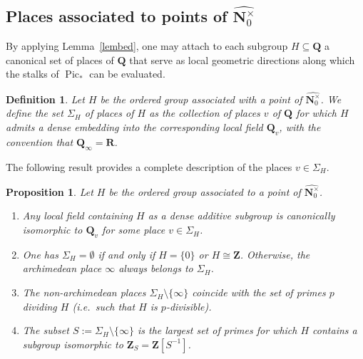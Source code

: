 \documentclass[11pt,a4paper]{article}
\newtheorem{proposition}[theorem]{Proposition}
\newtheorem{definition}[theorem]{Definition}
\newcommand{\N}{\mathbf{N}}
\newcommand{\Q}{\mathbf{Q}}
\newcommand{\R}{\mathbf{R}}
\newcommand{\Z}{\mathbf{Z}}
\newcommand{\nato}{\widehat{\N^\times_0}}
\newcommand{\Pic}{\operatorname{Pic}} \newcommand{\Jac}{\operatorname{Jac}}
\newcommand{\picone}{{\Pic}_{*}}
\def\ie{{\it i.e.\/}\ }
\begin{document}
\subsection{Places associated to points of $\nato$}

By applying Lemma~\ref{lembed}, one may attach to each subgroup $H\subseteq \Q$ a canonical set of places of $\Q$ that serve as local geometric directions along which the stalks of $\picone$ can be evaluated.

\begin{definition}\label{setplaces}
Let $H$ be the ordered group associated with a point of $\nato$. We define the set $\Sigma_H$ of \emph{places of $H$} as the collection of places $v$ of $\Q$ for which $H$ admits a dense embedding into the corresponding local field $\Q_v$, with the convention that $\Q_\infty=\R$.
\end{definition}

The following result provides a complete description 
of the places $v\in\Sigma_H$.

\begin{proposition}\label{classpla}
Let $H$ be the ordered group associated to a point of $\nato$. 
\begin{enumerate}
    \item[(i)] Any local field containing $H$ as a dense additive subgroup is canonically isomorphic to $\Q_v$ for some place $v\in\Sigma_H$.
    \item[(ii)] One has $\Sigma_H=\emptyset$ if and only if $H=\{0\}$ or 
    $H\cong\Z$. Otherwise, the archimedean place 
    $\infty$ always belongs to $\Sigma_H$.
    \item[(iii)] The non-archimedean places
    $
    \Sigma_H\setminus\{\infty\}
    $
    coincide with the set of primes $p$ dividing $H$
    (\ie such that $H$ is $p$-divisible).
    \item[(iv)] The subset
    $
    S:=\Sigma_H\setminus\{\infty\}
    $
    is the largest set of primes for which $H$ contains a subgroup isomorphic to
    $
    \Z_S=\Z[S^{-1}]$.
\end{enumerate}
\end{proposition}
\end{document}
